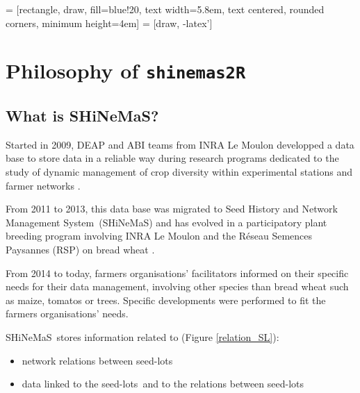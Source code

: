 \documentclass{article}\usepackage[]{graphicx}\usepackage[]{color}
\renewcommand{\sl}{seed-lots}
\newcommand{\BDfull}{Seed History and Network Management System}
\newcommand{\BD}{SHiNeMaS}
\newcommand{\pack}{\texttt{shinemas2R}}
\begin{document}
 = [rectangle, draw, fill=blue!20, text width=5.8em, text centered, rounded corners, minimum height=4em]
 = [draw, -latex']
    




\newpage


\section{Philosophy of \pack}

\subsection{What is \BD?}

Started in 2009, DEAP and ABI teams from INRA Le Moulon developped a data base to store data in a reliable way during research programs dedicated to the study of dynamic management of crop diversity within experimental stations and farmer networks \citep{thomas_gestion_2011}. 

From 2011 to 2013, this data base was migrated to \BDfull~(\BD) and has evolved in a participatory plant breeding program involving INRA Le Moulon and the Réseau Semences Paysannes (RSP) on bread wheat \citep{riviere_methodologie_2014}.

From 2014 to today, farmers organisations' facilitators informed on  their specific needs for their data management, involving other species than bread wheat such as maize, tomatos or trees. Specific developments were performed to fit the farmers organisations' needs. 

\BD~stores information related to (Figure \ref{relation_SL}):
\begin{itemize}
\item network relations between \sl
\item data linked to the \sl~and to the relations between \sl
\end{itemize}
\end{document}
